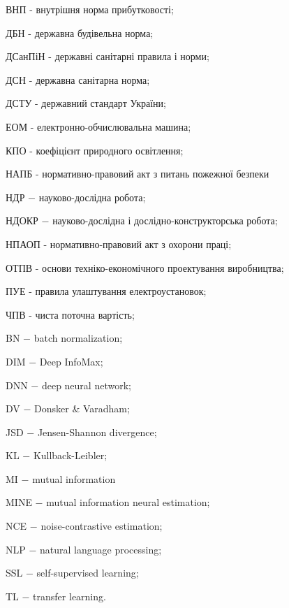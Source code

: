 

\hspace*{26pt}

ВНП - внутрішня норма прибутковості;

ДБН - державна будівельна норма;

ДСанПіН - державні санітарні правила і норми;

ДСН - державна санітарна норма;

ДСТУ - державний стандарт України;

ЕОМ - електронно-обчислювальна машина;

КПО - коефіцієнт природного освітлення;

НАПБ - нормативно-правовий акт з питань пожежної безпеки

НДР $-$ науково-дослідна робота;

НДОКР $-$ науково-дослідна і дослідно-конструкторська робота;

НПАОП - нормативно-правовий акт з охорони праці;

ОТПВ - основи техніко-економічного проектування виробництва;

ПУЕ - правила улаштування електроустановок;

ЧПВ - чиста поточна вартість;


BN $-$ batch normalization;

DIM $-$ Deep InfoMax;

DNN $-$ deep neural network;

DV $-$ Donsker \& Varadham;

JSD $-$ Jensen-Shannon divergence;

KL $-$ Kullback-Leibler;

MI $-$ mutual information

MINE $-$ mutual information neural estimation;

NCE $-$ noise-contrastive estimation;

NLP $-$ natural language processing;

SSL $-$ self-supervised learning;

TL $-$ transfer learning.
